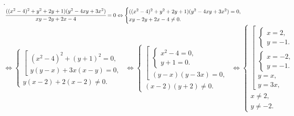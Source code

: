 \documentclass[12pt]{article}
\begin{document}
\begin{figure}[ht!]
\end{figure}\newpage{}. $\cfrac{((x^2-4)^2+y^2+2y+1)(y^2-4xy+3x^2)}{xy-2y+2x-4}=0\Leftrightarrow
\begin{cases}
((x^2-4)^2+y^2+2y+1)(y^2-4xy+3x^2)=0,\\
xy-2y+2x-4\neq0.
\end{cases}$\\$\Leftrightarrow
\begin{cases}
\left[\begin{array}{l}
(x^2-4)^2+(y+1)^2=0,\\
y(y-x)+3x(x-y)=0,
\end{array}\right.\\
y(x-2)+2(x-2)\neq0.
\end{cases}\Leftrightarrow
\begin{cases}
\left[\begin{array}{l}
\begin{cases}
x^2-4=0,\\
y+1=0.
\end{cases}\\
(y-x)(y-3x)=0,
\end{array}\right.\\
(x-2)(y+2)\neq0.
\end{cases}\Leftrightarrow
\begin{cases}
\left[\begin{array}{l}
\begin{cases}
x=2,\\
y=-1.
\end{cases}\\
\begin{cases}
x=-2,\\
y=-1.
\end{cases}\\
y=x,\\
y=3x,
\end{array}\right.\\
x\neq2,\\
y\neq-2.
\end{cases}$
\end{document}
